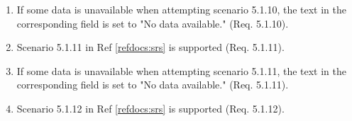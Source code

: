 \documentclass[a4paper]{article}
\newlength{\testlabellength}
\newenvironment{testlist}{\begin{enumerate}[label=\bfseries Instruction \thesubsection.\arabic* , labelindent=0pt, labelwidth=\testlabellength , leftmargin=2cm]}{\end{enumerate}}
\newenvironment{precondition}{
{\color{white}BLARG}\\ 
\textbf{Precondition}
\begin{itemize}[labelindent=0cm, labelwidth=2cm , leftmargin=1cm]
}
{\end{itemize}}
\newenvironment{instruction}{
\textbf{Instructions:}
\begin{enumerate}[label=\bfseries  \arabic*., labelindent=0cm, labelwidth=2cm , leftmargin=1cm]
}
{\end{enumerate}}
\newenvironment{postcondition}{
\textbf{Postcondition:}
\begin{itemize}[labelindent=0cm, labelwidth=2cm , leftmargin=1cm]
}
{\end{itemize}}
\begin{document}
\begin{appendices}
\begin{testlist}
	\item If some data is unavailable when attempting scenario 5.1.10, the text in the corresponding field is set to "No data available." (Req. 5.1.10).

	\item Scenario 5.1.11 in Ref \ref{refdocs:srs} is supported (Req. 5.1.11).

	\item If some data is unavailable when attempting scenario 5.1.11, the text in the corresponding field is set to "No data available." (Req. 5.1.11).

	\item Scenario 5.1.12 in Ref \ref{refdocs:srs} is supported (Req. 5.1.12).
\end{testlist}


\end{appendices}
\end{document}
